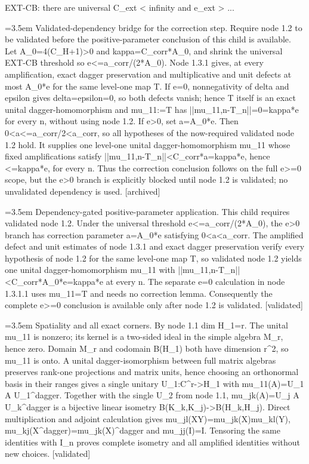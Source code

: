 \documentclass{article}
\newcommand{\step}[1]{\par\noindent\hangindent=3.5em\hangafter=1%
  \makebox[3.5em][l]{\textbf{#1.}}}
\newcommand{\steptag}[1]{\hfill{\small\textsf{[#1]}}}
\begin{document}
\begin{proofbox}{EXT-CB: there are universal C\_ext < infinity and e\_ext > ...}
\step{1.3.1.1.1} Validated-dependency bridge for the correction step. Require node 1.2 to be validated before the positive-parameter conclusion of this child is available. Let A\_0=4(C\_H+1)>0 and kappa=C\_corr*A\_0, and shrink the universal EXT-CB threshold so e<=a\_corr/(2*A\_0). Node 1.3.1 gives, at every amplification, exact dagger preservation and multiplicative and unit defects at most A\_0*e for the same level-one map T. If e=0, nonnegativity of delta and epsilon gives delta=epsilon=0, so both defects vanish; hence T itself is an exact unital dagger-homomorphism and mu\_11:=T has ||mu\_11,n-T\_n||=0=kappa*e for every n, without using node 1.2. If e>0, set a=A\_0*e. Then 0<a<=a\_corr/2<a\_corr, so all hypotheses of the now-required validated node 1.2 hold. It supplies one level-one unital dagger-homomorphism mu\_11 whose fixed amplifications satisfy ||mu\_11,n-T\_n||<C\_corr*a=kappa*e, hence <=kappa*e, for every n. Thus the correction conclusion follows on the full e>=0 scope, but the e>0 branch is explicitly blocked until node 1.2 is validated; no unvalidated dependency is used. \steptag{archived} \\[4pt]
\step{1.3.1.1.2} Dependency-gated positive-parameter application. This child requires validated node 1.2. Under the universal threshold e<=a\_corr/(2*A\_0), the e>0 branch has correction parameter a=A\_0*e satisfying 0<a<a\_corr. The amplified defect and unit estimates of node 1.3.1 and exact dagger preservation verify every hypothesis of node 1.2 for the same level-one map T, so validated node 1.2 yields one unital dagger-homomorphism mu\_11 with ||mu\_11,n-T\_n||<C\_corr*A\_0*e=kappa*e at every n. The separate e=0 calculation in node 1.3.1.1 uses mu\_11=T and needs no correction lemma. Consequently the complete e>=0 conclusion is available only after node 1.2 is validated. \steptag{validated} \\[4pt]
\step{1.3.2} Spatiality and all exact corners. By node 1.1 dim H\_1=r. The unital mu\_11 is nonzero; its kernel is a two-sided ideal in the simple algebra M\_r, hence zero. Domain M\_r and codomain B(H\_1) both have dimension r\textasciicircum{}2, so mu\_11 is onto. A unital dagger-isomorphism between full matrix algebras preserves rank-one projections and matrix units, hence choosing an orthonormal basis in their ranges gives a single unitary U\_1:C\textasciicircum{}r->H\_1 with mu\_11(A)=U\_1 A U\_1\textasciicircum{}dagger. Together with the single U\_2 from node 1.1, mu\_jk(A)=U\_j A U\_k\textasciicircum{}dagger is a bijective linear isometry B(K\_k,K\_j)->B(H\_k,H\_j). Direct multiplication and adjoint calculation gives mu\_jl(XY)=mu\_jk(X)mu\_kl(Y), mu\_kj(X\textasciicircum{}dagger)=mu\_jk(X)\textasciicircum{}dagger and mu\_jj(I)=I. Tensoring the same identities with I\_n proves complete isometry and all amplified identities without new choices. \steptag{validated} \\[4pt]

\end{proofbox}
\end{document}
